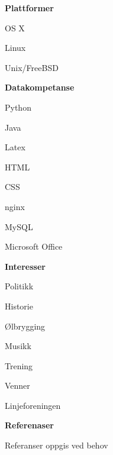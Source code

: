 \documentclass[a4paper,12pt,final]{memoir}
\newcommand{\Sep}{\vspace{1.5em}}
\newcommand{\SmallSep}{\vspace{0.5em}}
\newcommand{\CVSection}[1]
	{\Large\textbf{#1}\par
	\SmallSep\normalsize\normalfont}
\newcommand{\CVItem}[1]
	{\textbf{\color{RoyalBlue} #1}}
\begin{document}
\CVItem{Plattformer}
\begin{multicols}{3}
\begin{compactitem}[\color{RoyalBlue}$\circ$]
    \item OS X 
    \item Linux
    \item Unix/FreeBSD
\end{compactitem}
\end{multicols}
\SmallSep

\CVItem{Datakompetanse}
\begin{multicols}{3}
\begin{compactitem}[\color{RoyalBlue}$\circ$]
	\item Python 
	\item Java
	\item Latex 
	\item HTML
	\item CSS
	\item nginx 
	\item MySQL 
	\item Microsoft Office
\end{compactitem}
\end{multicols}
\SmallSep 

\CVItem{Interesser}
\begin{multicols}{3}
\begin{compactitem}[\color{RoyalBlue}$\circ$]
	\item Politikk 
	\item Historie
	\item Ølbrygging 
	\item Musikk
	\item Trening
	\item Venner
	\item Linjeforeningen
\end{compactitem}
\end{multicols}
\Sep 

\CVSection{Referenaser}
Referanser oppgis ved behov

\end{document}
